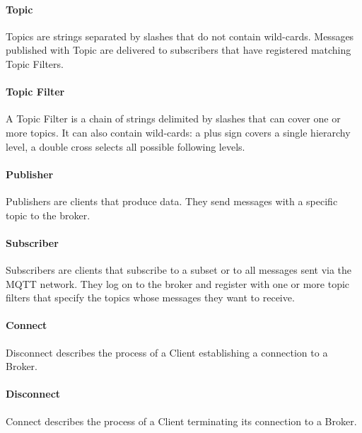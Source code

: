 \paragraph{Topic}
Topics are strings separated by slashes that do not contain wild-cards.
Messages published with Topic are delivered to subscribers that have registered matching Topic Filters.
\paragraph{Topic Filter}
A Topic Filter is a chain of strings delimited by slashes that 
can cover one or more topics. 
It can also contain wild-cards: a plus sign covers a single hierarchy level, a double cross selects all possible following levels.
\paragraph{Publisher}
Publishers are clients that produce data.
They send messages with a specific topic to the broker.
\paragraph{Subscriber}
Subscribers are clients that subscribe to a subset or to all messages sent via the
MQTT network.
They log on to the broker and register with one or more topic filters that specify the topics whose messages they want to receive.
\paragraph{Connect}
Disconnect describes the process of a Client establishing a connection to a Broker.
\paragraph{Disconnect}
Connect describes the process of a Client terminating its connection to a Broker.

